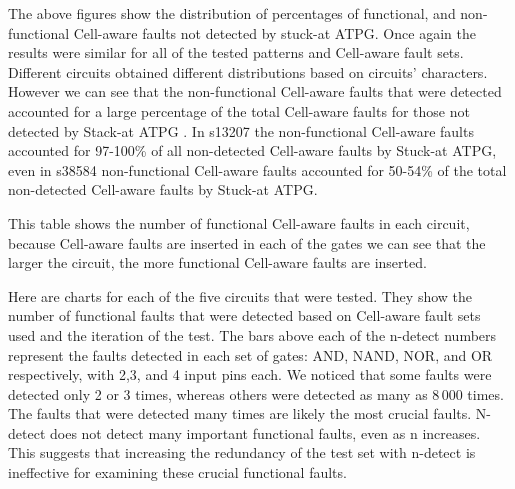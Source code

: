 The above figures show the distribution of percentages of functional, and non-functional Cell-aware faults not detected by stuck-at ATPG. Once again the results were similar for all of the tested patterns and Cell-aware fault sets. Different circuits obtained different distributions based on circuits’ characters. However we can see that the non-functional Cell-aware faults that were detected accounted for a large percentage of the total Cell-aware faults for those not detected by Stack-at ATPG . In s13207 the non-functional Cell-aware faults accounted for 97-100\% of all non-detected Cell-aware faults by Stuck-at ATPG, even in s38584 non-functional Cell-aware faults accounted for 50-54\% of the total non-detected Cell-aware faults by Stuck-at ATPG. 

This table shows the number of functional Cell-aware faults in each circuit, because Cell-aware faults are inserted in each of the gates we can see that the larger the circuit, the more functional Cell-aware faults are inserted.

Here are charts for each of the five circuits that were tested. They show the number of functional faults that were detected based on Cell-aware fault sets used and the iteration of the test. The bars above each of the n-detect numbers represent the faults detected in each set of gates: AND, NAND, NOR, and OR respectively, with 2,3, and 4 input pins each. We noticed that some faults were detected only 2 or 3 times, whereas others were detected as many as 8\,000 times. The faults that were detected many times are likely the most crucial faults. N-detect does not detect many important functional faults, even as n increases. This suggests that increasing the redundancy of the test set with n-detect is ineffective for examining these crucial functional faults. 






















